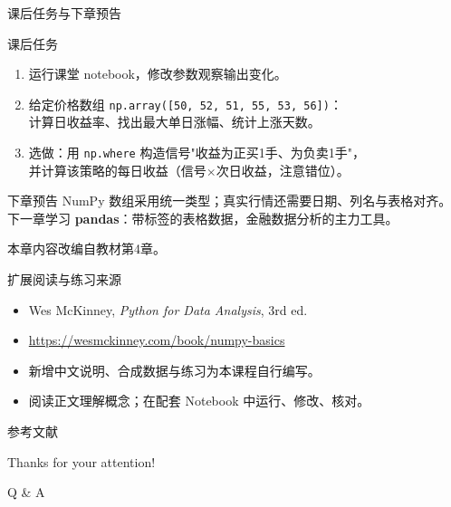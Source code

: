 \documentclass[9pt]{ctexbeamer}
\begin{document}
\begin{frame}{课后任务与下章预告}
	\begin{block}{课后任务}
		\begin{enumerate}
			\item 运行课堂 notebook，修改参数观察输出变化。
			\item 给定价格数组 \texttt{np.array([50, 52, 51, 55, 53, 56])}：\\
			计算日收益率、找出最大单日涨幅、统计上涨天数。
			\item 选做：用 \texttt{np.where} 构造信号"收益为正买1手、为负卖1手"，\\
			并计算该策略的每日收益（信号$\times$次日收益，注意错位）。
		\end{enumerate}
	\end{block}
	\begin{exampleblock}{下章预告}
		NumPy 数组采用统一类型；真实行情还需要日期、列名与表格对齐。\\
		下一章学习 \textbf{pandas}：带标签的表格数据，金融数据分析的主力工具。
	\end{exampleblock}
	\begin{center}
		\vspace{0.5em}
		本章内容改编自教材第4章\citep{hilpisch2018python}。
	\end{center}
\end{frame}


\begin{frame}{扩展阅读与练习来源}
\begin{itemize}
\item Wes McKinney, \textit{Python for Data Analysis}, 3rd ed.
\item \url{https://wesmckinney.com/book/numpy-basics}
\item 新增中文说明、合成数据与练习为本课程自行编写。
\item 阅读正文理解概念；在配套 Notebook 中运行、修改、核对。
\end{itemize}
\end{frame}

\appendix

\begin{frame}[allowframebreaks]{参考文献}
	
	
\end{frame}

\begin{frame}
	\begin{center}
		{\Huge\calligra Thanks for your attention!}
		\vspace{1cm}

		{\Huge Q \& A}
	\end{center}
\end{frame}
\end{document}
